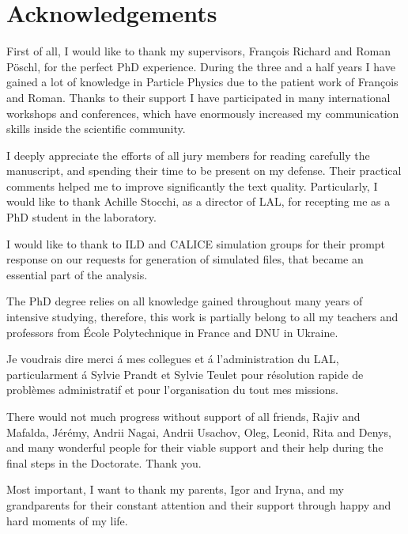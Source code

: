 \section*{Acknowledgements}
First of all, I would like to thank my supervisors, Fran\c cois Richard and Roman P\"oschl, for the perfect PhD experience. 
During the three and a half years I have gained a lot of knowledge in Particle Physics due to the patient work of Fran\c cois and Roman. 
Thanks to their support I have participated in many international workshops and conferences, which have enormously increased my communication skills inside the scientific community. 


I deeply appreciate the efforts of all jury members for reading carefully the manuscript, and spending their time to be present on my defense. Their practical comments helped me to improve significantly the text quality. 
Particularly, I would like to thank Achille Stocchi, as a director of LAL, for  recepting me as a PhD student in the laboratory.

I would like to thank to ILD and CALICE simulation groups for their prompt response on our requests for generation of simulated files, that became an essential part of the analysis. 

The PhD degree relies on all knowledge gained throughout many years of intensive studying, therefore, this work is partially belong to all my teachers and professors from \'Ecole Polytechnique in France and DNU in Ukraine. 

Je voudrais dire merci \'a mes collegues et \'a l'administration du LAL, particularment \'a Sylvie Prandt et Sylvie Teulet pour résolution rapide de problèmes administratif et pour l'organisation du tout mes missions.

There would not much progress without support of all friends, Rajiv and Mafalda, J\'er\'emy, Andrii Nagai, Andrii Usachov, Oleg, Leonid, Rita and Denys, and many wonderful people for their viable support and their help during the final steps in the Doctorate. Thank you. 

Most important, I want to thank my parents, Igor and Iryna, and my grandparents for their constant attention and their support through happy and hard moments of my life.  